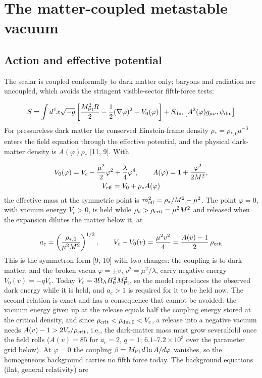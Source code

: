 \documentclass[11pt,a4paper]{article}
\begin{document}
\section{The matter-coupled metastable vacuum}
\subsection{Action and effective potential}
The scalar is coupled conformally to dark matter only; baryons and radiation are uncoupled, which avoids the stringent visible-sector fifth-force tests:

\begin{equation}
S=\int d^4x\sqrt{-g}\left[\frac{M_{\rm Pl}^2R}{2}-\frac{1}{2}(\nabla\varphi)^2-V_0(\varphi)\right]+S_{\rm dm}\left[A^2(\varphi)g_{\mu\nu},\psi_{\rm dm}\right]
\end{equation}
For pressureless dark matter the conserved Einstein-frame density $\rho_*=\rho_{*,0}a^{-3}$ enters the field equation through the effective potential, and the physical dark-matter density is $A(\varphi)\rho_*$ [11, 9]. With

\begin{equation}\begin{gathered}
V_0(\varphi)=V_c-\frac{\mu^2}{2}\varphi^2+\frac{\lambda}{4}\varphi^4,\qquad A(\varphi)=1+\frac{\varphi^2}{2M^2},\\
V_{\rm eff}=V_0+\rho_*A(\varphi)
\end{gathered}\end{equation}
the effective mass at the symmetric point is $m_{\rm eff}^2=\rho_*/M^2-\mu^2$. The point $\varphi=0$, with vacuum energy $V_c>0$, is held while $\rho_*>\rho_{\rm crit}=\mu^2M^2$ and released when the expansion dilutes the matter below it, at

\begin{equation}
a_c=\left(\frac{\rho_{*,0}}{\mu^2M^2}\right)^{1/3},\qquad V_c-V_0(v)=\frac{\mu^2v^2}{4}=\frac{A(v)-1}{2}\,\rho_{\rm crit}
\end{equation}
This is the symmetron form [9, 10] with two changes: the coupling is to dark matter, and the broken vacua $\varphi=\pm v$, $v^2=\mu^2/\lambda$, carry negative energy $V_0(v)=-qV_c$. Today $V_c=3\Omega_\Lambda H_0^2M_{\rm Pl}^2$, so the model reproduces the observed dark energy while it is held, and $a_c>1$ is required for it to be held now. The second relation is exact and has a consequence that cannot be avoided: the vacuum energy given up at the release equals half the coupling energy stored at the critical density, and since $\rho_{\rm crit}<\rho_{\rm dm,0}<V_c$, a release into a negative vacuum needs $A(v)-1>2V_c/\rho_{\rm crit}$, i.e., the dark-matter mass must grow severalfold once the field rolls ($A(v)=85$ for $a_c=2$, $q=1$; $6.1$--$7.2\times10^{3}$ over the parameter grid below). At $\varphi=0$ the coupling $\beta=M_{\rm Pl}\,d\ln A/d\varphi$ vanishes, so the homogeneous background carries no fifth force today. The background equations (flat, general relativity) are
\end{document}
